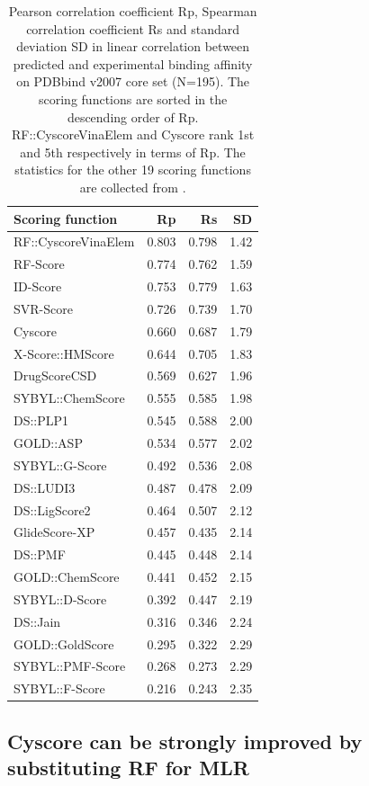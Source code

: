 \documentclass[journal=jacsat,manuscript=article]{achemso}
\begin{document}
\begin{table}
\caption{Pearson correlation coefficient Rp, Spearman correlation coefficient Rs and standard deviation SD in linear correlation between predicted and experimental binding affinity on PDBbind v2007 core set (N=195). The scoring functions are sorted in the descending order of Rp. RF::CyscoreVinaElem and Cyscore rank 1st and 5th respectively in terms of Rp. The statistics for the other 19 scoring functions are collected from \cite{1362}.}
\label{tbl:trn1105tst195}
\begin{tabular}{lrrr}
\hline
Scoring function & Rp & Rs & SD\\
\hline
RF::CyscoreVinaElem & 0.803 & 0.798 & 1.42\\
RF-Score & 0.774 & 0.762 & 1.59\\
ID-Score & 0.753 & 0.779 & 1.63\\
SVR-Score & 0.726 & 0.739 & 1.70\\
Cyscore & 0.660 & 0.687 & 1.79\\
X-Score::HMScore & 0.644 & 0.705 & 1.83\\
DrugScoreCSD & 0.569 & 0.627 & 1.96\\
SYBYL::ChemScore & 0.555 & 0.585 & 1.98\\
DS::PLP1 & 0.545 & 0.588 & 2.00\\
GOLD::ASP & 0.534 & 0.577 & 2.02\\
SYBYL::G-Score & 0.492 & 0.536 & 2.08\\
DS::LUDI3 & 0.487 & 0.478 & 2.09\\
DS::LigScore2 & 0.464 & 0.507 & 2.12\\
GlideScore-XP & 0.457 & 0.435 & 2.14\\
DS::PMF & 0.445 & 0.448 & 2.14\\
GOLD::ChemScore & 0.441 & 0.452 & 2.15\\
SYBYL::D-Score & 0.392 & 0.447 & 2.19\\
DS::Jain & 0.316 & 0.346 & 2.24\\
GOLD::GoldScore & 0.295 & 0.322 & 2.29\\
SYBYL::PMF-Score & 0.268 & 0.273 & 2.29\\
SYBYL::F-Score & 0.216 & 0.243 & 2.35\\
\hline
\end{tabular}
\end{table}

\subsection{Cyscore can be strongly improved by substituting RF for MLR}
\end{document}
